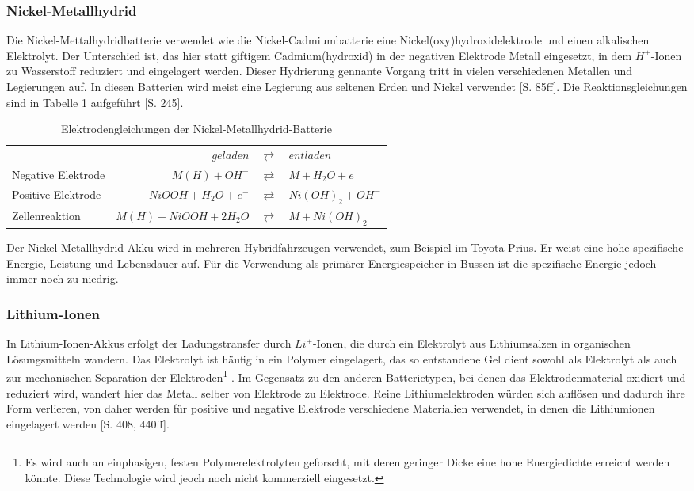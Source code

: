 \subsubsection{Nickel-Metallhydrid}
Die Nickel-Mettalhydridbatterie verwendet wie die Nickel-Cadmiumbatterie eine Nickel(oxy)hydroxidelektrode und einen alkalischen Elektrolyt. Der Unterschied ist, das hier statt giftigem Cadmium(hydroxid) in der negativen Elektrode Metall eingesetzt, in dem $H^+$-Ionen zu Wasserstoff reduziert und eingelagert werden. Dieser Hydrierung gennante Vorgang tritt in vielen verschiedenen Metallen und Legierungen auf. In diesen Batterien wird meist eine Legierung aus seltenen Erden und Nickel verwendet \cite{KiehneBattery}[S. 85ff]. Die Reaktionsgleichungen sind in Tabelle \ref{NiMH} aufgeführt \cite{Sterner:2014}[S. 245].\\
\begin{table}\centering
  \begin{tabularx}{\linewidth}{XrcX}
  	                   &              $geladen$ & $\rightleftarrows$ & $entladen$        \\
  	Negative Elektrode &          $M(H) + OH^-$ & $\rightleftarrows$ & $M + H_2O + e^-$  \\
  	Positive Elektrode &   $NiOOH + H_2O + e^-$ & $\rightleftarrows$ & $Ni(OH)_2 + OH^-$ \\ \midrule
  	Zellenreaktion     & $M(H) + NiOOH + 2H_2O$ & $\rightleftarrows$ & $M + Ni(OH)_2$    \\
  \end{tabularx}
  \caption{Elektrodengleichungen der Nickel-Metallhydrid-Batterie}
  \label{NiMH}
\end{table}
Der Nickel-Metallhydrid-Akku wird in mehreren Hybridfahrzeugen verwendet, zum Beispiel im Toyota Prius. Er weist eine hohe spezifische Energie, Leistung und Lebensdauer auf. Für die Verwendung als primärer Energiespeicher in Bussen ist die spezifische Energie jedoch immer noch zu niedrig. %
\subsubsection{Lithium-Ionen}
In Lithium-Ionen-Akkus erfolgt der Ladungstransfer durch $Li^+$-Ionen, die durch ein Elektrolyt aus Lithiumsalzen in organischen Lösungsmitteln wandern. Das Elektrolyt ist häufig in ein Polymer eingelagert, das so entstandene Gel dient sowohl als Elektrolyt als auch zur mechanischen Separation der Elektroden\footnote{Es wird auch an einphasigen, festen Polymerelektrolyten geforscht, mit deren geringer Dicke eine hohe Energiedichte erreicht werden könnte. Diese Technologie wird jeoch noch nicht kommerziell eingesetzt.} \cite{xu2004nonaqueous}. Im Gegensatz zu den anderen Batterietypen, bei denen das Elektrodenmaterial oxidiert und reduziert wird, wandert hier das Metall selber von Elektrode zu Elektrode. Reine Lithiumelektroden würden sich auflösen und dadurch ihre Form verlieren, von daher werden für positive und negative Elektrode verschiedene Materialien verwendet, in denen die Lithiumionen eingelagert werden \cite{KiehneBattery}[S. 408, 440ff].
